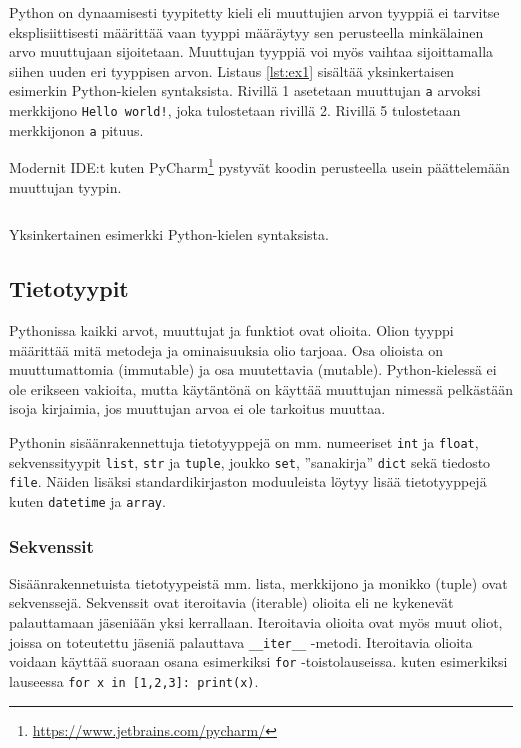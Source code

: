 \documentclass[finnish]{tktltiki2}
\theoremstyle{definition}
\theoremstyle{remark}
\begin{document}
Python on dynaamisesti tyypitetty kieli eli muuttujien arvon tyyppiä ei tarvitse eksplisiittisesti määrittää vaan tyyppi määräytyy sen perusteella minkälainen arvo muuttujaan sijoitetaan. Muuttujan tyyppiä voi myös vaihtaa sijoittamalla siihen uuden eri tyyppisen arvon. Listaus \ref{lst:ex1} sisältää yksinkertaisen esimerkin Python-kielen syntaksista. Rivillä 1 asetetaan muuttujan \verb|a| arvoksi merkkijono \verb|Hello world!|, joka tulostetaan rivillä 2. Rivillä 5 tulostetaan merkkijonon \verb|a| pituus.

Modernit IDE:t kuten PyCharm\footnote{\url{https://www.jetbrains.com/pycharm/}} pystyvät koodin perusteella usein päättelemään muuttujan tyypin.

\begin{listing}
    \inputminted[linenos]{python}{code/foo.py}
    \caption{Yksinkertainen esimerkki Python-kielen syntaksista.}
    \label{lst:ex1}
\end{listing}

\subsection{Tietotyypit}

Pythonissa kaikki arvot, muuttujat ja funktiot ovat olioita. Olion tyyppi määrittää mitä metodeja ja ominaisuuksia olio tarjoaa. Osa olioista on muuttumattomia (immutable) ja osa muutettavia (mutable). Python-kielessä ei ole erikseen vakioita, mutta käytäntönä on käyttää muuttujan nimessä pelkästään isoja kirjaimia, jos muuttujan arvoa ei ole tarkoitus muuttaa.

Pythonin sisäänrakennettuja tietotyyppejä on mm. numeeriset \verb|int| ja \verb|float|, sekvenssityypit \verb|list|, \verb|str| ja \verb|tuple|, joukko \verb|set|, ''sanakirja'' \verb|dict| sekä tiedosto \verb|file|. Näiden lisäksi standardikirjaston moduuleista löytyy lisää tietotyyppejä kuten \verb|datetime| ja \verb|array|.

\subsubsection{Sekvenssit}

Sisäänrakennetuista tietotyypeistä mm. lista, merkkijono ja monikko (tuple) ovat sekvenssejä. Sekvenssit ovat iteroitavia (iterable) olioita eli ne kykenevät palauttamaan jäseniään yksi kerrallaan. Iteroitavia olioita ovat myös muut oliot, joissa on toteutettu jäseniä palauttava \verb|__iter__| -metodi. Iteroitavia olioita voidaan käyttää suoraan osana esimerkiksi \verb|for| -toistolauseissa. kuten esimerkiksi lauseessa \verb|for x in [1,2,3]: print(x)|.
\end{document}
